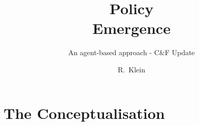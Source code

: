 \documentclass[whitelogo]{tudelft-report}
\renewcommand*{\sectionautorefname}{Section} %
\renewcommand*{\chapterautorefname}{Chapter} %
\begin{document}
\frontmatter

\title[tudelft-white]{Policy \\Emergence}
\subtitle[tudelft-cyan]{An agent-based approach - C\&F Update}
\author[tudelft-white]{R.\ Klein}
\titleoffsetx{2cm}
\titleoffsety{23cm}
\afiloffsetx{1cm}
\afiloffsety{18cm}
\makecover


\renewcommand*{\sectionautorefname}{Section} %
\renewcommand*{\chapterautorefname}{Chapter} %



\setcounter{tocdepth}{1}
\tableofcontents

\mainmatter

\renewcommand*{\sectionautorefname}{Section} %
\renewcommand*{\chapterautorefname}{Chapter} %

%

\chapter{The Conceptualisation}
\label{cha:conceptualisationRevised}

\end{document}
